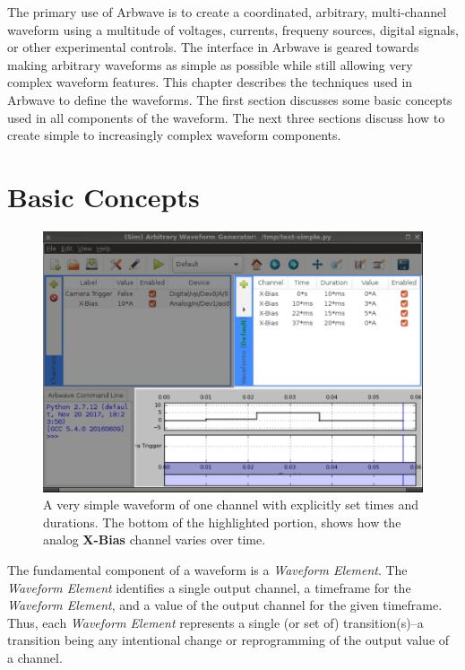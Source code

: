 \thispagestyle{fancy}
\pagestyle{fancy}

The primary use of Arbwave is to create a coordinated, arbitrary, multi-channel
waveform using a multitude of voltages, currents, frequeny sources, digital
signals, or other experimental controls.  The interface in Arbwave is geared
towards making arbitrary waveforms as simple as possible while still allowing
very complex waveform features.  This chapter describes the techniques used in
Arbwave to define the waveforms.  The first section discusses some basic
concepts used in all components of the waveform.  The next three sections discuss
how to create simple to increasingly complex waveform components.

\section{Basic Concepts}
\begin{figure}[ht!]
  \centerline{\includegraphics[width=.8\textwidth]{figures/basic-waveform}}
  \caption[Very simple waveform]{
    A very simple waveform of one channel with explicitly set times and
    durations.  The bottom of the highlighted portion, shows how the analog
    \textbf{X-Bias} channel varies over time.
  }
  \label{fig:waveforms:basic}
\end{figure}

The fundamental component of a waveform is a \textit{Waveform Element}.  The
\textit{Waveform Element} identifies a single output channel, a timeframe for
the \textit{Waveform Element}, and a value of the output channel for the given
timeframe.  Thus, each \textit{Waveform Element} represents a single (or set of)
transition(s)--a transition being any intentional change or reprogramming of the
output value of a channel.

